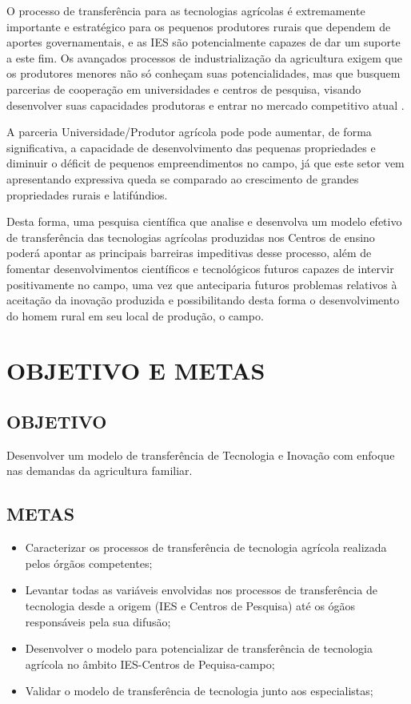 O processo de transferência para as tecnologias agrícolas é extremamente importante e  estratégico para os pequenos produtores rurais que dependem de aportes governamentais, e as IES são potencialmente  capazes de dar um suporte a este fim. Os avançados processos de industrialização da agricultura exigem que os produtores menores não só conheçam suas potencialidades, mas que busquem parcerias de cooperação em universidades e centros de pesquisa, visando desenvolver suas capacidades produtoras e entrar no mercado competitivo atual \cite{silva_modelo_2016}.

A parceria Universidade/Produtor agrícola pode pode aumentar, de forma
significativa, a capacidade de desenvolvimento das pequenas propriedades e diminuir o déficit de pequenos empreendimentos no campo, já que este setor vem apresentando expressiva queda se comparado ao crescimento de grandes propriedades rurais e latifúndios. 



Desta forma, uma pesquisa científica que analise e desenvolva um modelo efetivo de transferência das tecnologias agrícolas produzidas nos Centros de ensino poderá apontar as principais barreiras impeditivas desse processo, além de fomentar desenvolvimentos científicos e tecnológicos futuros capazes de intervir positivamente no campo, uma vez que anteciparia futuros problemas relativos à aceitação da inovação produzida e possibilitando desta forma o desenvolvimento do homem rural em seu local de produção, o campo.

\section{OBJETIVO E METAS}

\subsection{OBJETIVO}
Desenvolver um modelo de transferência de Tecnologia e Inovação com enfoque nas demandas da agricultura familiar.

\subsection{METAS}

\begin{itemize}
\item{Caracterizar os processos de transferência de tecnologia agrícola realizada pelos órgãos competentes;}
\item {Levantar todas as variáveis envolvidas nos processos de transferência de tecnologia desde a  origem (IES e Centros de Pesquisa) até os ógãos responsáveis pela sua difusão;}
\item {Desenvolver o modelo para potencializar de transferência de tecnologia agrícola no âmbito IES-Centros de Pequisa-campo;}
\item {Validar o modelo de transferência de tecnologia junto aos especialistas;}
\end{itemize}


